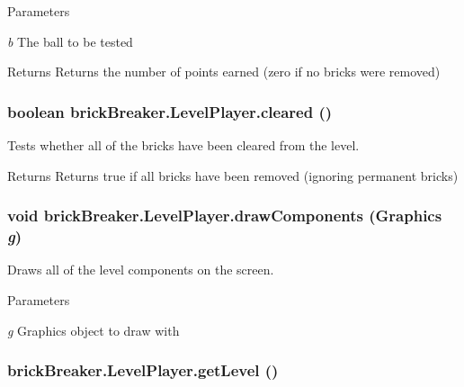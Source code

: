 \begin{DoxyParams}{Parameters}
\item[{\em b}]The ball to be tested \end{DoxyParams}
\begin{DoxyReturn}{Returns}
Returns the number of points earned (zero if no bricks were removed) 
\end{DoxyReturn}
\hypertarget{classbrick_breaker_1_1_level_player_a952e8b565a2c36ac471f7ab020972294}{
\subsubsection[{cleared}]{\setlength{\rightskip}{0pt plus 5cm}boolean brickBreaker.LevelPlayer.cleared ()}}
\label{classbrick_breaker_1_1_level_player_a952e8b565a2c36ac471f7ab020972294}
Tests whether all of the bricks have been cleared from the level. \begin{DoxyReturn}{Returns}
Returns true if all bricks have been removed (ignoring permanent bricks) 
\end{DoxyReturn}
\hypertarget{classbrick_breaker_1_1_level_player_ae54384ce113e96099dd14d73acd7de5e}{
\subsubsection[{drawComponents}]{\setlength{\rightskip}{0pt plus 5cm}void brickBreaker.LevelPlayer.drawComponents (Graphics {\em g})}}
\label{classbrick_breaker_1_1_level_player_ae54384ce113e96099dd14d73acd7de5e}
Draws all of the level components on the screen. 
\begin{DoxyParams}{Parameters}
\item[{\em g}]Graphics object to draw with \end{DoxyParams}
\hypertarget{classbrick_breaker_1_1_level_player_a732aa75e9304df978a19452b95b6ee87}{
\subsubsection[{getLevel}]{ brickBreaker.LevelPlayer.getLevel ()}}
